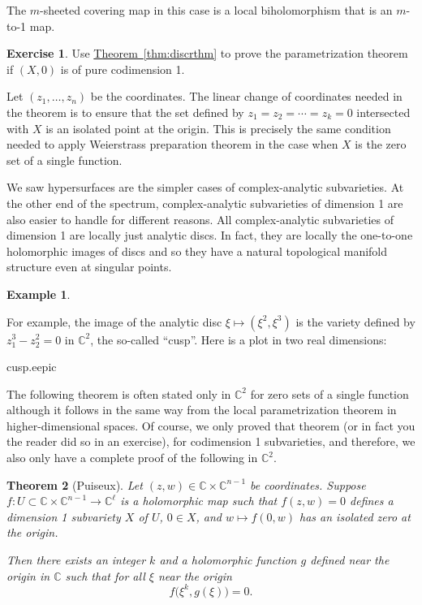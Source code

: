 \documentclass[12pt,openany]{book}
\newcommand{\C}{{\mathbb{C}}}
\newcommand{\myindex}[1]{#1\index{#1}}
\theoremstyle{plain}
\newtheorem{thm}{Theorem}[section]
\theoremstyle{remark}
\theoremstyle{definition}
\newenvironment{exbox}{%
    \def\FrameCommand{\vrule width 1pt \relax\hspace {10pt}}%
    \MakeFramed {\advance \hsize -\width \FrameRestore }%
}{%
    \endMakeFramed
}
\newenvironment{myfig}{%
    \begin{center}
}{%
    \end{center}
}
\theoremstyle{exercise}
\newtheorem{exercise}{Exercise}[section]
\theoremstyle{example}
\newtheorem{example}[thm]{Example}
\newcommand{\thmref}[1]{\hyperref[#1]{Theorem~\ref*{#1}}}
\begin{document}
The $m$-sheeted covering map in this case is a local biholomorphism
that is an $m$-to-1 map.

\begin{exbox}
\begin{exercise}
Use \thmref{thm:discrthm}
to prove the parametrization theorem if $(X,0)$ is
of pure codimension 1.
\end{exercise}
\end{exbox}

Let $(z_1,\ldots,z_n)$ be the coordinates.
The linear change of coordinates needed in the theorem is
to ensure that the set defined by $z_1=z_2=\cdots=z_k = 0$ intersected
with $X$ is an isolated point at the origin.  This is precisely
the same condition needed to apply Weierstrass preparation theorem in the case
when $X$ is the zero set of a single function.

We saw hypersurfaces are the simpler cases of complex-analytic
subvarieties.  At the other end of the spectrum, complex-analytic
subvarieties of dimension 1 are also easier to handle for different reasons.
All complex-analytic subvarieties of dimension 1 are locally just analytic discs.
In fact, they are locally the one-to-one holomorphic images of discs
and so they have a natural topological manifold structure even at singular
points.

\begin{example}
\begin{samepage}
For example, the image of the analytic disc
$\xi \mapsto (\xi^2,\xi^3)$ is the variety
defined by $z_1^3-z_2^2 = 0$ in $\C^2$, the so-called ``cusp''.  Here is a
plot in two real dimensions:

\begin{myfig}
\medskip
{cusp.eepic}
\bigskip
\end{myfig}
\end{samepage}
\end{example}


The following theorem is often stated only in $\C^2$ for zero sets of
a single function although it follows in
the same way from the local parametrization theorem in higher-dimensional
spaces.  Of course, we only
proved that theorem (or in fact you the reader did so in an exercise), for
codimension 1 subvarieties, and therefore, we also only have a complete
proof of the following in $\C^2$.

\begin{thm}[\myindex{Puiseux}]
Let $(z,w) \in \C \times \C^{n-1}$ be coordinates.
Suppose $f \colon U \subset \C \times \C^{n-1} \to \C^\ell$
is a holomorphic map such that
$f(z,w) = 0$ defines a dimension 1 subvariety $X$ of $U$,
$0 \in X$,
and $w \mapsto f(0,w)$ has an isolated zero at the origin.

Then there exists an integer $k$ and a holomorphic function $g$ defined near
the origin in $\C$ such that
for all $\xi$ near the origin
\begin{equation*}
f\bigl(\xi^k,g(\xi)\bigr) = 0 .
\end{equation*}
\end{thm}
\end{document}

